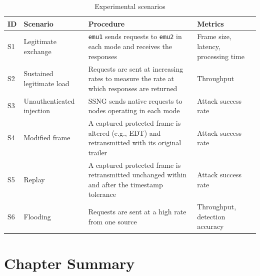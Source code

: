 \begin{table}[htbp]
  \centering
  \caption{Experimental scenarios}
  \label{tab:scenarios}
  \footnotesize
  \renewcommand{\arraystretch}{1.2}
  \begin{tabularx}{\textwidth}{@{}l >{\raggedright\arraybackslash}p{3.3cm} >{\raggedright\arraybackslash}X >{\raggedright\arraybackslash}p{2.6cm}@{}}
    \toprule
    \textbf{ID} & \textbf{Scenario}                & \textbf{Procedure}                                                                                                   & \textbf{Metrics}                         \\
    \midrule
    S1          & Legitimate exchange              & \texttt{emu1} sends \tbd{} requests to \texttt{emu2} in each mode and receives the responses                          & Frame size, latency, processing time     \\
    S2          & Sustained legitimate load        & Requests are sent at increasing rates to measure the rate at which responses are returned                           & Throughput                               \\
    S3          & Unauthenticated injection        & SSNG sends native requests to nodes operating in each mode                                                          & Attack success rate                      \\
    S4          & Modified frame                   & A captured protected frame is altered (e.g., EDT) and retransmitted with its original trailer                        & Attack success rate                      \\
    S5          & Replay                           & A captured protected frame is retransmitted unchanged within and after the timestamp tolerance                      & Attack success rate                      \\
    S6          & Flooding                         & Requests are sent at a high rate from one source                                                                    & Throughput, detection accuracy           \\
    \bottomrule
  \end{tabularx}
\end{table}

\section{Chapter Summary}
\label{sec:i-summary}

